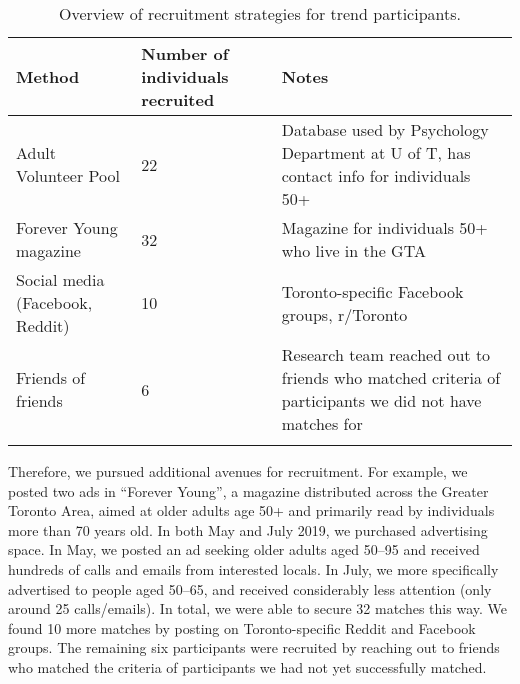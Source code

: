 \documentclass[output=paper]{langscibook}
\begin{document}


\begin{table}
\begin{tabularx}{\textwidth}{XYY}
\lsptoprule
{ Method} & { Number of individuals recruited} & { Notes}\\
\midrule
{ {Adult Volunteer Pool}} & { {22}} & { {Database used by Psychology Department at U of T, has contact info for individuals 50+}}\\
\midrule
{ {Forever Young magazine}} & { {32}} & { {Magazine for individuals 50+ who live in the GTA}}\\
\midrule
{ {Social media (Facebook, Reddit)}} & { {10}} & { {Toronto-specific Facebook groups, r/Toronto}}\\
\midrule
{ {Friends of friends}} & { {6}} & { {Research team reached out to friends who matched criteria of participants we did not have matches for}}\\
\lspbottomrule
\end{tabularx}
\caption{Overview of recruitment strategies for trend participants.}
\label{tab:pabst:3}
\end{table}

Therefore, we pursued additional avenues for recruitment. For example, we posted two ads in “Forever Young”, a magazine distributed across the Greater Toronto Area, aimed at older adults age 50+ and primarily read by individuals more than 70 years old. In both May and July 2019, we purchased advertising space. In May, we posted an ad seeking older adults aged 50--95 and received hundreds of calls and emails from interested locals. In July, we more specifically advertised to people aged 50--65, and received considerably less attention (only around 25 calls/emails). In total, we were able to secure 32 matches this way. We found 10 more matches by posting on Toronto-specific Reddit and Facebook groups. The remaining six participants were recruited by reaching out to friends who matched the criteria of participants we had not yet successfully matched.
\end{document}
